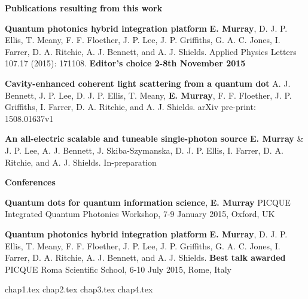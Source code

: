 \documentclass[12pt, oneside]{book}
\begin{document}
\newpage \large\textbf{Publications resulting from this work}

\small \textbf{Quantum photonics hybrid integration platform} \newline
\textbf{E. Murray}, D. J. P. Ellis, T. Meany, F. F. Floether, J. P. Lee, J. P.
Griffiths, G. A. C. Jones, I. Farrer, D. A. Ritchie, A. J. Bennett, and A. J.
Shields. \newline Applied Physics Letters 107.17 (2015): 171108. \newline \textbf{Editor's choice 2-8th November 2015}

\small \textbf{Cavity-enhanced coherent light scattering from a quantum dot} A.
J. Bennett, J. P. Lee, D. J. P. Ellis, T. Meany, \textbf{E. Murray}, F. F.
Floether, J. P. Griffiths, I. Farrer, D. A. Ritchie, and A. J. Shields. \newline
arXiv pre-print: 1508.01637v1

\small \textbf{An all-electric scalable and tuneable single-photon source}
\textbf{E. Murray} \& J. P. Lee, A. J. Bennett, J. Skiba-Szymanska, D. J. P. Ellis, I. Farrer, D. A. Ritchie, and A. J. Shields. \newline
In-preparation


\large\textbf{Conferences}

\small \textbf{Quantum dots for quantum information science}, \newline
\textbf{E. Murray} \newline PICQUE Integrated Quantum Photonics Workshop, 7-9
January 2015, Oxford, UK

\small \textbf{Quantum photonics hybrid integration platform} \newline
\textbf{E. Murray}, D. J. P. Ellis, T. Meany, F. F. Floether, J. P. Lee, J. P.
Griffiths, G. A. C. Jones, I. Farrer, D. A. Ritchie, A. J. Bennett, and A. J.
Shields. \newline \textbf{Best talk awarded} PICQUE Roma Scientific School, 6-10
July 2015, Rome, Italy

\newpage \tableofcontents

{chap1.tex}
{chap2.tex}
{chap3.tex}
{chap4.tex}

 {}
\end{document}
